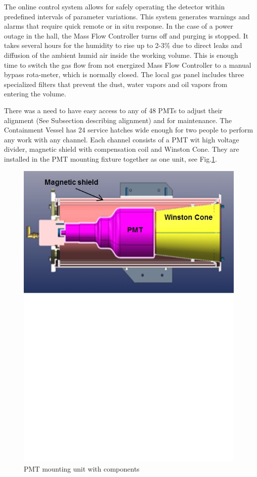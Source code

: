 \indent  The online control system allows for safely operating the detector within predefined intervals of parameter variations. This system generates warnings and alarms that require quick remote or in situ response. In the case of a power outage in the hall, the Mass Flow Controller turns off and purging is stopped. It takes several hours for the humidity to rise up to 2-3\% due to direct leaks and diffusion of the ambient humid air inside the working volume. This is enough time to switch the gas flow from not energized Mass Flow Controller to a manual bypass rota-meter, which is normally closed. The local gas panel includes three specialized filters that prevent the dust, water vapors and oil vapors from entering the volume.

\indent There was a need to have easy access to any of 48 PMTs to adjust their alignment (See Subsection describing alignment) and for maintenance. The Containment Vessel has 24 service hatches wide enough for two people to perform any work with any channel. Each channel consists of a PMT wit high voltage divider, magnetic shield with compensation coil and Winston Cone. They are installed in the PMT mounting fixture together as one unit, see Fig.\ref{fig:PMT_Mount}.

\begin{figure}[ht]
    \centering
    \includegraphics[width=1.0\linewidth,trim={0 12cm 0 0},clip]{images/PMT_Mount.jpg}
    \caption{PMT mounting unit with components}
    \label{fig:PMT_Mount}
\end{figure}

